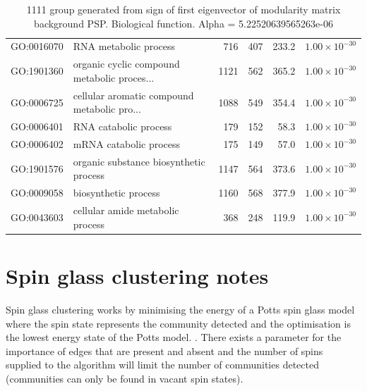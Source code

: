 \begin{table}[ht]
\begin{tabular}{llrrrr}
  GO:0016070 & RNA metabolic process & 716 & 407 & 233.2 & $1.00 \times 10^{-30}$ \\ 
  GO:1901360 & organic cyclic compound metabolic proces... & 1121 & 562 & 365.2 & $1.00 \times 10^{-30}$ \\ 
  GO:0006725 & cellular aromatic compound metabolic pro... & 1088 & 549 & 354.4 & $1.00 \times 10^{-30}$ \\ 
  GO:0006401 & RNA catabolic process & 179 & 152 & 58.3 & $1.00 \times 10^{-30}$ \\ 
  GO:0006402 & mRNA catabolic process & 175 & 149 & 57.0 & $1.00 \times 10^{-30}$ \\ 
  GO:1901576 & organic substance biosynthetic process & 1147 & 564 & 373.6 & $1.00 \times 10^{-30}$ \\ 
  GO:0009058 & biosynthetic process & 1160 & 568 & 377.9 & $1.00 \times 10^{-30}$ \\ 
  GO:0043603 & cellular amide metabolic process & 368 & 248 & 119.9 & $1.00 \times 10^{-30}$ \\ 
   \hline
\end{tabular}
\caption{1111 group generated from sign of first eigenvector of modularity matrix background PSP. Biological function. Alpha = 5.22520639565263e-06} 
\label{tab:1111 group generated from sign of first eigenvector of modularity matrix background PSP. Biological function. Alpha = 5.22520639565263e-06}
\end{table}

\section{Spin glass clustering notes}

Spin glass clustering works by minimising the energy of a Potts spin glass model where the spin state represents the community detected and the optimisation is the lowest energy state of the Potts model. \cite{reichardt2006statistical}. There exists a parameter for the importance of edges that are present and absent and the number of spins supplied to the algorithm will limit the number of communities detected (communities can only be found in vacant spin states).

